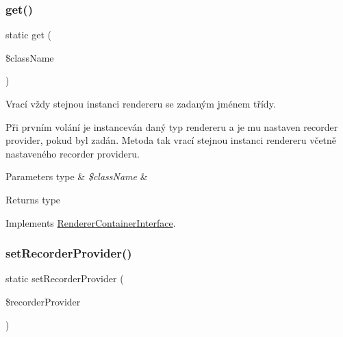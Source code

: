 \subsubsection{\texorpdfstring{get()}{get()}}
{\footnotesize\ttfamily static get (\begin{DoxyParamCaption}\item[{}]{\$class\+Name }\end{DoxyParamCaption})\hspace{0.3cm}{\ttfamily [static]}}

Vrací vždy stejnou instanci rendereru se zadaným jménem třídy.

Při prvním volání je instanceván daný typ rendereru a je mu nastaven recorder provider, pokud byl zadán. Metoda tak vrací stejnou instanci rendereru včetně nastaveného recorder provideru.


\begin{DoxyParams}[1]{Parameters}
type & {\em \$class\+Name} & \\
\hline
\end{DoxyParams}
\begin{DoxyReturn}{Returns}
type 
\end{DoxyReturn}


Implements \mbox{\hyperlink{interface_pes_1_1_view_1_1_renderer_1_1_renderer_container_interface}{Renderer\+Container\+Interface}}.

\mbox{\label{class_pes_1_1_view_1_1_renderer_1_1_renderer_container_a068b4012f760f18deb809c5836409a52}} 
\subsubsection{\texorpdfstring{set\+Recorder\+Provider()}{setRecorderProvider()}}
{\footnotesize\ttfamily static set\+Recorder\+Provider (\begin{DoxyParamCaption}\item[{\mbox{\hyperlink{interface_pes_1_1_view_1_1_recorder_1_1_recorder_provider_interface}{Recorder\+Provider\+Interface}}}]{\$recorder\+Provider }\end{DoxyParamCaption})\hspace{0.3cm}{\ttfamily [static]}}

